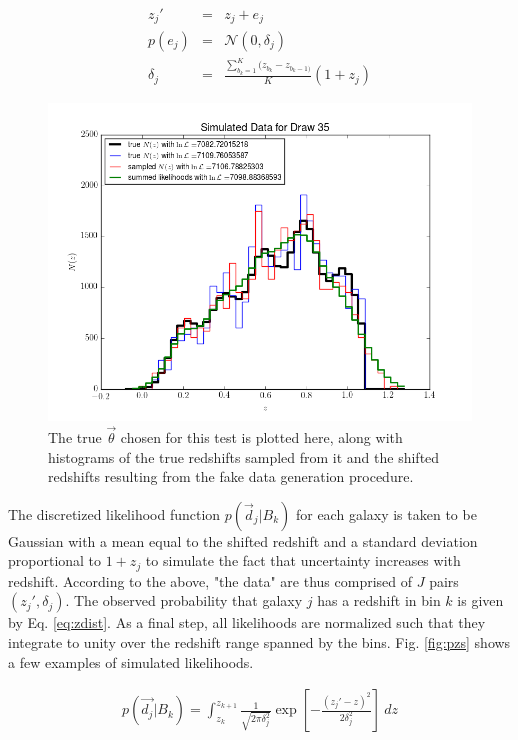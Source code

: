 \documentclass[12pt, onecolumn]{emulateapj}
\begin{document}
\begin{mathletters}
\begin{eqnarray}
\label{eq:zshift}
z_{j}' &=& z_{j}+e_{j}\\
p(e_{j}) &=& \mathcal{N}(0,\delta_{j})\nonumber\\
\delta_{j} &=& \frac{\sum_{b_{k}=1}^{K}(z_{b_{k}}-z_{b_{k}-1)}}{K}(1+z_{j})\nonumber
\end{eqnarray}
\end{mathletters}

\begin{figure}
\label{fig:samples}
\includegraphics[scale=0.5]{exdata.png}
\caption{The true $\vec{\theta}$ chosen for this test is plotted here, along with histograms of the true redshifts sampled from it and the shifted redshifts resulting from the fake data generation procedure.}
\end{figure}

The discretized likelihood function $p(\vec{d}_{j}|B_{k})$ for each galaxy is taken to be Gaussian with a mean equal to the shifted redshift and a standard deviation proportional to $1+z_{j}$ to simulate the fact that uncertainty increases with redshift.  According to the above, "the data" are thus comprised of $J$ pairs $(z_{j}',\delta_{j})$.  The observed probability that galaxy $j$ has a redshift in bin $k$ is given by Eq. \ref{eq:zdist}.  As a final step, all likelihoods are normalized such that they integrate to unity over the redshift range spanned by the bins.  Fig. \ref{fig:pzs} shows a few examples of simulated likelihoods.

\begin{eqnarray}
\label{eq:zdist}
p(\vec{d_{j}}|B_{k}) = \int_{z_{k}}^{z_{k+1}} \frac{1}{\sqrt{2\pi\delta_{j}^{2}}}\exp\left[-\frac{(z_{j}'-z)^{2}}{2\delta_{j}^{2}}\right]\ dz
\end{eqnarray}
\end{document}
